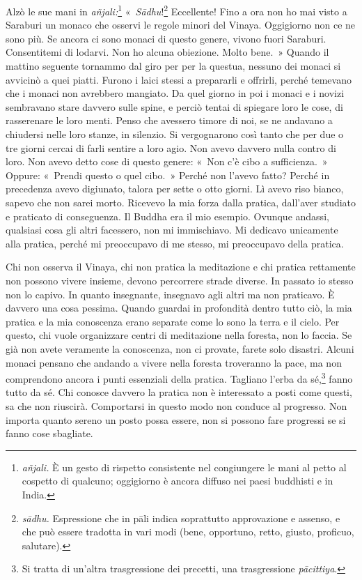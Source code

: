 Alzò le sue mani in \emph{añjali:}\footnote{\emph{añjali.} È un gesto di
  rispetto consistente nel congiungere le mani al petto al cospetto di
  qualcuno; oggigiorno è ancora diffuso nei paesi buddhisti e in India.}
«~\emph{Sādhu}!\footnote{\emph{sādhu.} Espressione che in pāli indica
  soprattutto approvazione e assenso, e che può essere tradotta in vari
  modi (bene, opportuno, retto, giusto, proficuo, salutare).}
Eccellente! Fino a ora non ho mai visto a Saraburi un monaco che osservi
le regole minori del Vinaya. Oggigiorno non ce ne sono più. Se ancora ci
sono monaci di questo genere, vivono fuori Saraburi. Consentitemi di
lodarvi. Non ho alcuna obiezione. Molto bene.~» Quando il mattino
seguente tornammo dal giro per per la questua, nessuno dei monaci si
avvicinò a quei piatti. Furono i laici stessi a prepararli e offrirli,
perché temevano che i monaci non avrebbero mangiato. Da quel giorno in
poi i monaci e i novizi sembravano stare davvero sulle spine, e perciò
tentai di spiegare loro le cose, di rasserenare le loro menti. Penso che
avessero timore di noi, se ne andavano a chiudersi nelle loro stanze, in
silenzio. Si vergognarono così tanto che per due o tre giorni cercai di
farli sentire a loro agio. Non avevo davvero nulla contro di loro. Non
avevo detto cose di questo genere: «~Non c'è cibo a sufficienza.~»
Oppure: «~Prendi questo o quel cibo.~» Perché non l'avevo fatto? Perché
in precedenza avevo digiunato, talora per sette o otto giorni. Lì avevo
riso bianco, sapevo che non sarei morto. Ricevevo la mia forza dalla
pratica, dall'aver studiato e praticato di conseguenza. Il Buddha era il
mio esempio. Ovunque andassi, qualsiasi cosa gli altri facessero, non mi
immischiavo. Mi dedicavo unicamente alla pratica, perché mi preoccupavo
di me stesso, mi preoccupavo della pratica.

Chi non osserva il Vinaya, chi non pratica la meditazione e chi pratica
rettamente non possono vivere insieme, devono percorrere strade diverse.
In passato io stesso non lo capivo. In quanto insegnante, insegnavo agli
altri ma non praticavo. È davvero una cosa pessima. Quando guardai in
profondità dentro tutto ciò, la mia pratica e la mia conoscenza erano
separate come lo sono la terra e il cielo. Per questo, chi vuole
organizzare centri di meditazione nella foresta, non lo faccia. Se già
non avete veramente la conoscenza, non ci provate, farete solo disastri.
Alcuni monaci pensano che andando a vivere nella foresta troveranno la
pace, ma non comprendono ancora i punti essenziali della pratica.
Tagliano l'erba da sé,\footnote{Si tratta di un'altra trasgressione dei
  precetti, una trasgressione \emph{pācittiya}.} fanno tutto da sé. Chi
conosce davvero la pratica non è interessato a posti come questi, sa che
non riuscirà. Comportarsi in questo modo non conduce al progresso. Non
importa quanto sereno un posto possa essere, non si possono fare
progressi se si fanno cose sbagliate.

